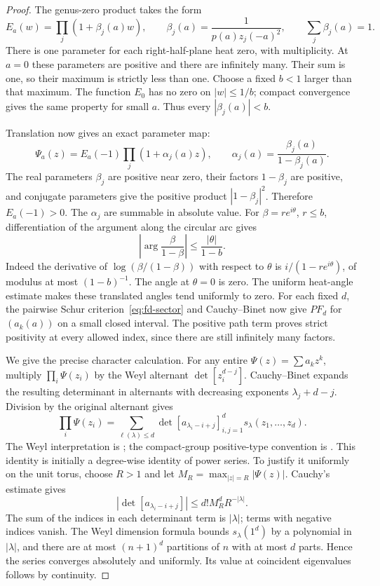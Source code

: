 \begin{proof}
The genus-zero product takes the form
\[
 E_a(w)=\prod_j(1+\beta_j(a)w),\qquad
 \beta_j(a)=\frac1{p(a)z_j(-a)^2},\qquad
 \sum_j\beta_j(a)=1.
\]
There is one parameter for each right-half-plane heat zero, with
multiplicity. At \(a=0\) these parameters are positive and there
are infinitely many. Their sum is one, so their maximum is
strictly less than one. Choose a fixed \(b<1\) larger than that
maximum. The function \(E_0\) has no zero on \(|w|\le1/b\);
compact convergence gives the same property for small \(a\).
Thus every \(|\beta_j(a)|<b\).

Translation now gives an exact parameter map:
\[
 \Psi_a(z)=E_a(-1)\prod_j(1+\alpha_j(a)z),\qquad
 \alpha_j(a)=\frac{\beta_j(a)}{1-\beta_j(a)}.
\]
The real parameters \(\beta_j\) are positive near zero, their
factors \(1-\beta_j\) are positive, and conjugate parameters
give the positive product \(|1-\beta_j|^2\). Therefore
\(E_a(-1)>0\). The \(\alpha_j\) are summable in absolute value.
For \(\beta=re^{i\theta}\), \(r\le b\), differentiation of the
argument along the circular arc gives
\[
 \left|\arg\frac{\beta}{1-\beta}\right|
 \le\frac{|\theta|}{1-b}.
\]
Indeed the derivative of \(\log(\beta/(1-\beta))\) with respect
to \(\theta\) is \(i/(1-re^{i\theta})\), of modulus at most
\((1-b)^{-1}\). The angle at \(\theta=0\) is zero.
The uniform heat-angle estimate makes these translated angles
tend uniformly to zero. For each fixed \(d\), the pairwise
Schur criterion~\eqref{eq:fd-sector} and Cauchy--Binet now give
\(PF_d\) for \((a_k(a))\) on a small closed interval. The
positive path term proves strict positivity at every allowed
index, since there are still infinitely many factors.

We give the precise character calculation. For any entire
\(\Psi(z)=\sum a_kz^k\), multiply \(\prod_i\Psi(z_i)\) by the
Weyl alternant \(\det[z_i^{d-j}]\). Cauchy--Binet expands the
resulting determinant in alternants with decreasing exponents
\(\lambda_j+d-j\). Division by the original alternant gives
\[
 \prod_i\Psi(z_i)=
 \sum_{\ell(\lambda)\le d}
       \det[a_{\lambda_i-i+j}]_{i,j=1}^d s_\lambda(z_1,\ldots,z_d).
\]
The Weyl interpretation is
\cite[Theorem~5.22.1, p.~129]{Etingof2011}; the compact-group
positive-type convention is \cite[Section~4.1, p.~56]{Faraut2007}.
This identity is initially a degree-wise identity of power series.
To justify it uniformly on the unit torus, choose \(R>1\) and
let \(M_R=\max_{|z|=R}|\Psi(z)|\). Cauchy's estimate gives
\[
 \left|\det[a_{\lambda_i-i+j}]\right|
 \le d!M_R^d R^{-|\lambda|}.
\]
The sum of the indices in each determinant term is \(|\lambda|\);
terms with negative indices vanish. The Weyl dimension formula
bounds \(s_\lambda(1^d)\) by a polynomial in \(|\lambda|\), and
there are at most \((n+1)^d\) partitions of \(n\) with at most
\(d\) parts. Hence the series converges absolutely and uniformly.
Its value at coincident eigenvalues follows by continuity.


\end{proof}
